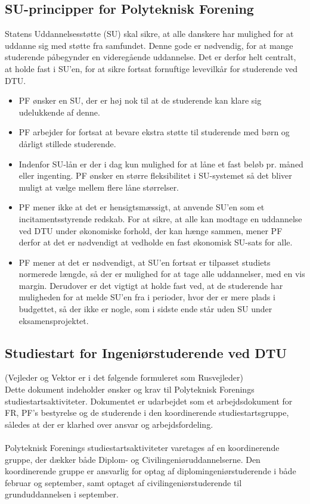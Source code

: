 \subsection{SU-principper for Polyteknisk Forening}
Statens Uddannelsesstøtte (SU) skal sikre, at alle danskere har mulighed for at uddanne sig med støtte fra samfundet. Denne gode er nødvendig, for at mange studerende påbegynder en videregående uddannelse. Det er derfor helt centralt, at holde fast i SU’en, for at sikre fortsat fornuftige levevilkår for studerende ved DTU.
\begin{itemize}
\item PF ønsker en SU, der er høj nok til at de studerende kan klare sig udelukkende af denne.
\item PF arbejder for fortsat at bevare ekstra støtte til studerende med børn og dårligt stillede studerende.
\item Indenfor SU-lån er der i dag kun mulighed for at låne et fast beløb pr. måned eller ingenting. PF ønsker en større fleksibilitet i SU-systemet så det bliver muligt at vælge mellem flere låne størrelser.
\item PF mener ikke at det er hensigtsmæssigt, at anvende SU’en som et incitamentsstyrende redskab. For at sikre, at alle kan modtage en uddannelse ved DTU under økonomiske forhold, der kan hænge sammen, mener PF derfor at det er nødvendigt at vedholde en fast økonomisk SU-sats for alle.
\item PF mener at det er nødvendigt, at SU’en fortsat er tilpasset studiets normerede længde, så der er mulighed for at tage alle uddannelser, med en vis margin. Derudover er det vigtigt at holde fast ved, at de studerende har muligheden for at melde SU’en fra i perioder, hvor der er mere plads i budgettet, så der ikke er nogle, som i sidste ende står uden SU under eksamensprojektet.
\end{itemize}

\subsection{Studiestart for Ingeniørstuderende ved DTU}
(Vejleder og Vektor er i det følgende formuleret som Rusvejleder)\\
Dette dokument indeholder ønsker og krav til Polyteknisk Forenings studiestartsaktiviteter. Dokumentet er udarbejdet som et arbejdsdokument for FR, PF’s bestyrelse og de studerende i den koordinerende studiestartsgruppe, således at der er klarhed over ansvar og arbejdsfordeling.\\
\\
Polyteknisk Forenings studiestartsaktiviteter varetages af en koordinerende gruppe, der dækker både Diplom- og Civilingeniøruddannelserne. Den koordinerende gruppe er ansvarlig for optag af diplomingeniørstuderende i både februar og september, samt optaget af civilingeniørstuderende til grunduddannelsen i september.

